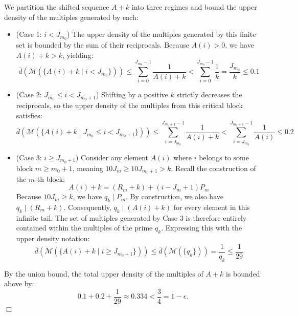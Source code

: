 We partition the shifted sequence $A+k$ into three regimes and bound the upper density of the multiples generated by each:
\begin{itemize}
    \item (Case 1: $i < J_{m_0}$) The upper density of the multiples generated by this finite set is bounded by the sum of their reciprocals. Because $A(i) > 0$, we have $A(i) + k > k$, yielding:
    $$\overline{d}(\mathcal{M}(\{A(i) + k \mid i < J_{m_0}\})) \leq \sum_{i = 0}^{J_{m_0} - 1} \frac{1}{A(i) + k} < \sum_{i = 0}^{J_{m_0} - 1} \frac{1}{k} = \frac{J_{m_0}}{k} \leq 0.1$$
    \item (Case 2: $J_{m_0} \leq i < J_{m_0+1}$) Shifting by a positive $k$ strictly decreases the reciprocals, so the upper density of the multiples from this critical block satisfies:
    $$\overline{d}(\mathcal{M}(\{A(i) + k \mid J_{m_0} \le i < J_{m_0+1}\})) \le \sum_{i=J_{m_0}}^{J_{m_0+1}-1} \frac{1}{A(i) + k} < \sum_{i=J_{m_0}}^{J_{m_0+1}-1} \frac{1}{A(i)} \le 0.2$$
    \item (Case 3: $i \geq J_{m_0 + 1}$) Consider any element $A(i)$ where $i$ belongs to some block $m \ge m_0 + 1$, meaning $10 J_m \ge 10 J_{m_0+1} > k$. Recall the construction of the $m$-th block:
    $$A(i) + k = (R_m + k) + (i - J_m + 1)P_m$$
    Because $10 J_m \ge k$, we have $q_k \mid P_m$. By construction, we also have $q_k \mid (R_m + k)$. Consequently, $q_k \mid (A(i) + k)$ for every element in this infinite tail. The set of multiples generated by Case 3 is therefore entirely contained within the multiples of the prime $q_k$. Expressing this with the upper density notation:
    $$\overline{d}(\mathcal{M}(\{A(i) + k \mid i \ge J_{m_0+1}\})) \le \overline{d}(\mathcal{M}(\{q_k\})) = \frac{1}{q_k} \le \frac{1}{29}$$
\end{itemize}
By the union bound, the total upper density of the multiples of $A+k$ is bounded above by:
$$0.1 + 0.2 + \frac{1}{29} \approx 0.334 < \frac{3}{4} = 1 - \epsilon.$$ \hfill $\Box$
